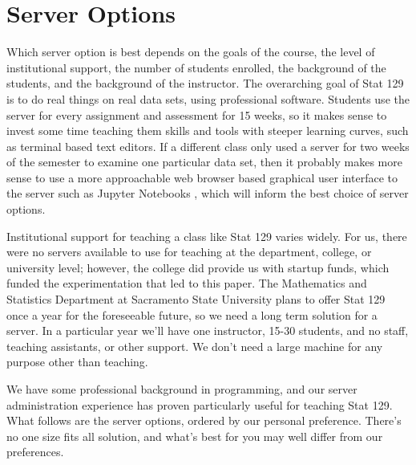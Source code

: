 \documentclass[12pt]{article}
\begin{document}
\section{Server Options}


Which server option is best depends on the goals of the course, the level of institutional support, the number of students enrolled, the background of the students, and the background of the instructor.
The overarching goal of Stat 129 is to do real things on real data sets, using professional software.
Students use the server for every assignment and assessment for 15 weeks, so it makes sense to invest some time teaching them skills and tools with steeper learning curves, such as terminal based text editors.
If a different class only used a server for two weeks of the semester to examine one particular data set, then it probably makes more sense to use a more approachable web browser based graphical user interface to the server such as Jupyter Notebooks \cite{kluyver2016jupyter}, which will inform the best choice of server options.

Institutional support for teaching a class like Stat 129 varies widely.
For us, there were no servers available to use for teaching at the department, college, or university level; however, the college did provide us with startup funds, which funded the experimentation that led to this paper.
The Mathematics and Statistics Department at Sacramento State University plans to offer Stat 129 once a year for the foreseeable future, so we need a long term solution for a server.
In a particular year we'll have one instructor, 15-30 students, and no staff, teaching assistants, or other support.
We don't need a large machine for any purpose other than teaching.

We have some professional background in programming, and our server administration experience has proven particularly useful for teaching Stat 129.
What follows are the server options, ordered by our personal preference.
There's no one size fits all solution, and what's best for you may well differ from our preferences.



\end{document}
